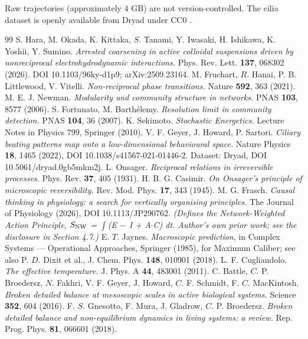 \documentclass[aps,pre,preprint,superscriptaddress,nofootinbib,longbibliography]{revtex4-2}
\begin{document}
Raw trajectories (approximately 4 GB) are not version-controlled. The cilia dataset is openly available from Dryad under CC0 \cite{r6}.

\begin{thebibliography}{99}
 S. Hara, M. Okada, K. Kittaka, $S$. Tanami, Y. Iwasaki, H. Ishikawa, K. Yoshii, Y. Sumino. \emph{Arrested coarsening in active colloidal suspensions driven by nonreciprocal electrohydrodynamic interactions.} Phys. Rev. Lett. \textbf{137}, 068302 (2026). DOI 10.1103/96ky-d1p9; arXiv:2509.23164.
 M. Fruchart, $R$. Hanai, P. B. Littlewood, V. Vitelli. \emph{Non-reciprocal phase transitions.} Nature \textbf{592}, 363 (2021).
 M. E. J. Newman. \emph{Modularity and community structure in networks.} PNAS \textbf{103}, 8577 (2006).
 S. Fortunato, M. Barth\'elemy. \emph{Resolution limit in community detection.} PNAS \textbf{104}, 36 (2007).
 K. Sekimoto. \emph{Stochastic Energetics.} Lecture Notes in Physics 799, Springer (2010).
 V. F. Geyer, J. Howard, P. Sartori. \emph{Ciliary beating patterns map onto a low-dimensional behavioural space.} Nature Physics \textbf{18}, 1465 (2022), DOI 10.1038/s41567-021-01446-2. Dataset: Dryad, DOI 10.5061/dryad.0gb5mkm2j.
 L. Onsager. \emph{Reciprocal relations in irreversible processes.} Phys. Rev. \textbf{37}, 405 (1931).
 H. B. G. Casimir. \emph{On Onsager's principle of microscopic reversibility.} Rev. Mod. Phys. \textbf{17}, 343 (1945).
 M. G. Frasch. \emph{Causal thinking in physiology: a search for vertically organising principles.} The Journal of Physiology (2026), DOI 10.1113/JP290762. \emph{(Defines the Network-Weighted Action Principle, $S_{\rm NW}$ = $\int$(E $-$ I + A$\cdot$C) dt. Author's own prior work; see the disclosure in Section 4.7.)}
 E. $T$. Jaynes. \emph{Macroscopic prediction}, in Complex Systems --- Operational Approaches, Springer (1985), for Maximum Caliber; see also P. $D$. Dixit et al., J. Chem. Phys. \textbf{148}, 010901 (2018).
 L. F. Cugliandolo. \emph{The effective temperature.} J. Phys. A \textbf{44}, 483001 (2011).
 C. Battle, $C$. P. Broedersz, $N$. Fakhri, V. F. Geyer, J. Howard, $C$. F. Schmidt, F. $C$. MacKintosh. \emph{Broken detailed balance at mesoscopic scales in active biological systems.} Science \textbf{352}, 604 (2016).
 F. $S$. Gnesotto, F. Mura, J. Gladrow, $C$. P. Broedersz. \emph{Broken detailed balance and non-equilibrium dynamics in living systems: a review.} Rep. Prog. Phys. \textbf{81}, 066601 (2018).

\end{thebibliography}
\end{document}
